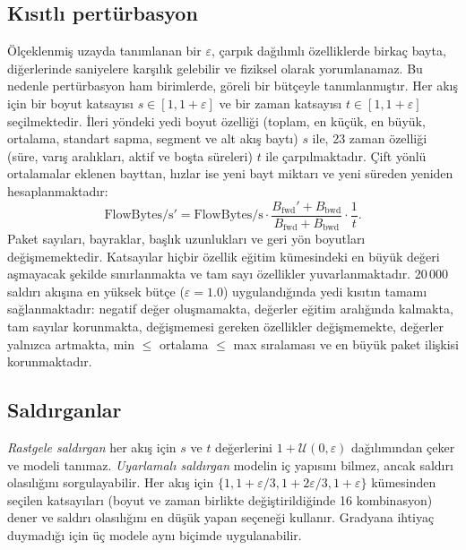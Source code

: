 \documentclass[conference]{IEEEtran}
\begin{document}
\subsection{Kısıtlı pertürbasyon}
Ölçeklenmiş uzayda tanımlanan bir $\varepsilon$, çarpık dağılımlı özelliklerde birkaç bayta, diğerlerinde saniyelere karşılık gelebilir ve fiziksel olarak yorumlanamaz. Bu nedenle pertürbasyon ham birimlerde, göreli bir bütçeyle tanımlanmıştır. Her akış için bir boyut katsayısı $s \in [1, 1+\varepsilon]$ ve bir zaman katsayısı $t \in [1, 1+\varepsilon]$ seçilmektedir. İleri yöndeki yedi boyut özelliği (toplam, en küçük, en büyük, ortalama, standart sapma, segment ve alt akış baytı) $s$ ile, 23 zaman özelliği (süre, varış aralıkları, aktif ve boşta süreleri) $t$ ile çarpılmaktadır. Çift yönlü ortalamalar eklenen bayttan, hızlar ise yeni bayt miktarı ve yeni süreden yeniden hesaplanmaktadır:
\begin{equation}
\text{FlowBytes/s}' = \text{FlowBytes/s}\cdot\frac{B_{\text{fwd}}' + B_{\text{bwd}}}{B_{\text{fwd}} + B_{\text{bwd}}}\cdot\frac{1}{t}.
\end{equation}
Paket sayıları, bayraklar, başlık uzunlukları ve geri yön boyutları değişmemektedir. Katsayılar hiçbir özellik eğitim kümesindeki en büyük değeri aşmayacak şekilde sınırlanmakta ve tam sayı özellikler yuvarlanmaktadır. 20\,000 saldırı akışına en yüksek bütçe ($\varepsilon=1.0$) uygulandığında yedi kısıtın tamamı sağlanmaktadır: negatif değer oluşmamakta, değerler eğitim aralığında kalmakta, tam sayılar korunmakta, değişmemesi gereken özellikler değişmemekte, değerler yalnızca artmakta, min $\leq$ ortalama $\leq$ max sıralaması ve en büyük paket ilişkisi korunmaktadır.

\subsection{Saldırganlar}
\emph{Rastgele saldırgan} her akış için $s$ ve $t$ değerlerini $1+\mathcal{U}(0,\varepsilon)$ dağılımından çeker ve modeli tanımaz. \emph{Uyarlamalı saldırgan} modelin iç yapısını bilmez, ancak saldırı olasılığını sorgulayabilir. Her akış için $\{1, 1+\varepsilon/3, 1+2\varepsilon/3, 1+\varepsilon\}$ kümesinden seçilen katsayıları (boyut ve zaman birlikte değiştirildiğinde 16 kombinasyon) dener ve saldırı olasılığını en düşük yapan seçeneği kullanır. Gradyana ihtiyaç duymadığı için üç modele aynı biçimde uygulanabilir.
\end{document}
